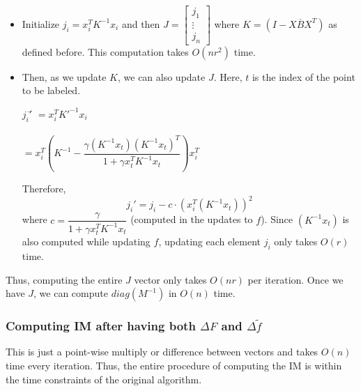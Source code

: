 \documentclass[12pt]{article}
\newcommand{\inv}[1]{#1^{-1}}
\begin{document}
			\begin{itemize}
				\item Initialize $j_i= x_i^T \inv{K} x_i$ and then $J = \left[\begin{matrix}j_1\\ \vdots \\ j_n\end{matrix}\right]$ where $K=(I-X\overline{B}X^T)$ as defined before. This computation takes $O(nr^2)$ time.
				\item Then, as we update $K$, we can also update $J$. Here, $t$ is the index of the point to be labeled. 
				\begin{tabbing}
					$j_i'$\= $= x_i^T \inv{K'} x_i$\\\\
					\>$= x_i^T\left(\inv{K} - \dfrac{\gamma(\inv{K}x_t) (\inv{K}x_t)^T}{1+\gamma x_t^T \inv{K} x_t}\right)x_i^T$
				\end{tabbing}
				Therefore,
				\begin{equation}
					j_i' = j_i - c\cdot (x_i^T(\inv{K}x_t))^2	
				\end{equation}
				where $c = \dfrac{\gamma}{1+\gamma x_t^T \inv{K} x_t}$ (computed in the updates to $f$). Since $(\inv{K}x_t)$ is also computed while updating $f$, updating each element $j_i$ only takes $O(r)$ time. 

			\end{itemize}
			Thus, computing the entire $J$ vector only takes $O(nr)$ per iteration. Once we have $J$, we can compute $diag (\inv{M})$ in $O(n)$ time.



		\subsubsection{Computing IM after having both $\Delta F$ and $\Delta \widetilde{f}$}
			This is just a point-wise multiply or difference between vectors and takes $O(n)$ time every iteration. Thus, the entire procedure of computing the IM is within the time constraints of the original algorithm.
\end{document}
